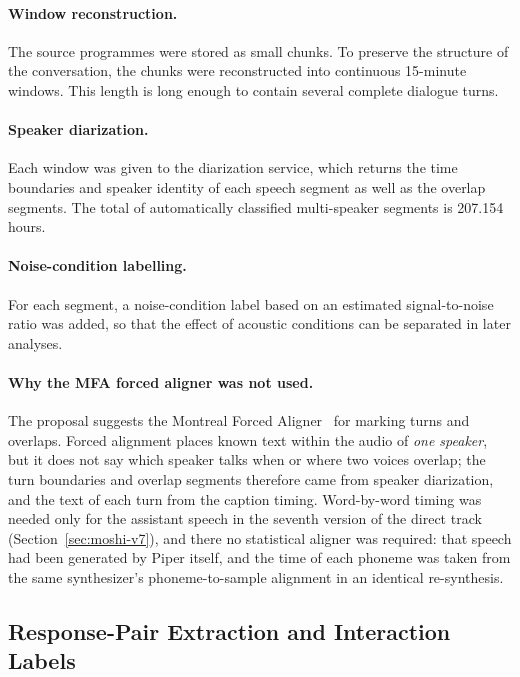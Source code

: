 \paragraph{Window reconstruction.} The source programmes were stored as small chunks.
To preserve the structure of the conversation, the chunks were reconstructed into
continuous 15-minute windows. This length is long enough to contain several complete
dialogue turns.

\paragraph{Speaker diarization.} Each window was given to the diarization service,
which returns the time boundaries and speaker identity of each speech segment as well
as the overlap segments. The total of automatically classified multi-speaker segments
is 207.154 hours.

\paragraph{Noise-condition labelling.} For each segment, a noise-condition label
based on an estimated signal-to-noise ratio was added, so that the effect of acoustic
conditions can be separated in later analyses.

\paragraph{Why the MFA forced aligner was not used.} The proposal suggests the
Montreal Forced Aligner~\cite{mcauliffe2017mfa} for marking turns and overlaps. Forced
alignment places known text within the audio of \emph{one speaker}, but it does not say
which speaker talks when or where two voices overlap; the turn boundaries and overlap
segments therefore came from speaker diarization, and the text of each turn from the
caption timing. Word-by-word timing was needed only for the assistant speech in the
seventh version of the direct track (Section~\ref{sec:moshi-v7}), and there no statistical
aligner was required: that speech had been generated by Piper itself, and the time of
each phoneme was taken from the same synthesizer's phoneme-to-sample alignment in an
identical re-synthesis.

\subsection{Response-Pair Extraction and Interaction Labels}
\label{sec:pairs}

